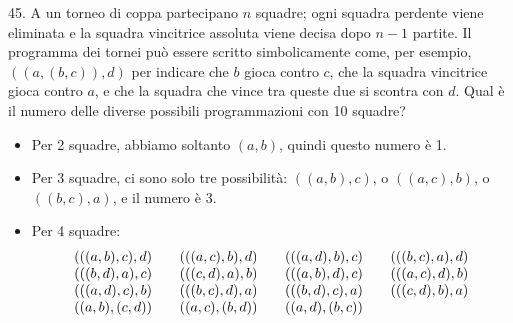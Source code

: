 \begin{problem}{45.} 
	A un torneo di coppa partecipano $n$ squadre; ogni squadra perdente viene eliminata e la squadra vincitrice assoluta viene decisa dopo $n-1$ partite.
	Il programma dei tornei può essere scritto simbolicamente come, per esempio, $((a,(b,c)),d)$ per indicare che $b$ gioca contro $c$, che la squadra vincitrice gioca contro $a$, e che la squadra che vince  tra queste due si scontra con $d$.
	Qual è il numero delle diverse possibili programmazioni con 10 squadre?
	\begin{itemize}
		\item Per 2 squadre, abbiamo soltanto $(a,b)$, quindi questo numero è 1.
		\item Per 3 squadre, ci sono solo tre possibilità: $((a,b),c)$, o $((a,c),b)$, o $((b,c),a)$, e il numero è 3.
		\item Per 4 squadre:
			\begin{equation*}
				\begin{array}{@{}cccc@{}}
					(((a,b),c),d) & \quad\;(((a,c),b),d) & \quad\;(((a,d),b),c) & \quad\;(((b,c),a),d) \\
					(((b,d),a),c) & \quad\;(((c,d),a),b) & \quad\;(((a,b),d),c) & \quad\;(((a,c),d),b) \\ 
					(((a,d),c),b) & \quad\;(((b,c),d),a) & \quad\;(((b,d),c),a) & \quad\;(((c,d),b),a) \\
					((a,b),(c,d)) & \quad\;((a,c),(b,d)) & \quad\;((a,d),(b,c))
				\end{array}
			\end{equation*}
	\end{itemize}
\end{problem}


